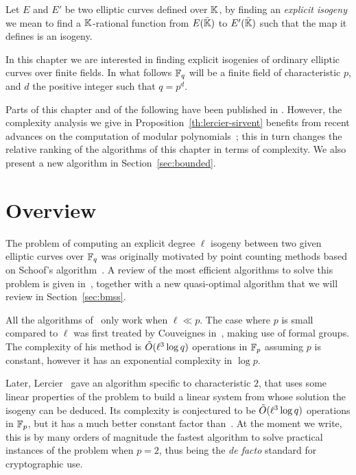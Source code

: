 

Let $E$ and $E'$ be two elliptic curves defined over $\mathbb{K}$, by finding
an \emph{explicit isogeny} we mean to find a $\mathbb{K}$-rational function
from $E(\bar{\mathbb{K}})$ to $E'(\bar{\mathbb{K}})$ such that the map it defines is
an isogeny.

In this chapter we are interested in finding explicit isogenies of
ordinary elliptic curves over finite fields. In what follows $\mathbb{F}_q$
will be a finite field of characteristic $p$, and $d$ the positive
integer such that $q=p^d$.

Parts of this chapter and of the following have been published
in \cite{df10}. However, the complexity analysis we give in
Proposition~\ref{th:lercier-sirvent} benefits from recent advances on
the computation of modular polynomials~\cite{sutherland10:modpol};
this in turn changes the relative ranking of the algorithms of this
chapter in terms of complexity. We also present a new algorithm in
Section~\ref{sec:bounded}.


\section{Overview}
\label{sec:history}

The problem of computing an explicit degree $\ell$ isogeny between two
given elliptic curves over $\mathbb{F}_q$ was originally motivated by point
counting methods based on Schoof's
algorithm~\cite{atkin88,elkies98,schoof95}. A review of the most
efficient algorithms to solve this problem is given
in~\cite{bostan+morain+salvy+schost08}, together with a new
quasi-optimal algorithm that we will review in Section~\ref{sec:bmss}.

All the algorithms of~\cite{bostan+morain+salvy+schost08} only work
when $\ell\ll p$. The case where $p$ is small compared to $\ell$ was
first treated by Couveignes in~\cite{couveignes94}, making use of
formal groups. The complexity of his method is $\tilde{O}(\ell^3\log q)$ operations in
$\mathbb{F}_p$ assuming $p$ is constant, however it has an exponential
complexity in $\log p$.

Later, Lercier~\cite{lercier96} gave an algorithm specific to
characteristic $2$, that uses some linear properties of the problem to
build a linear system from whose solution the isogeny can be deduced.
Its complexity is conjectured to be $\tilde{O}(\ell^3\log q)$ operations
in $\mathbb{F}_p$, but it has a much better constant factor
than~\cite{couveignes94}. At the moment we write, this is by many
orders of magnitude the fastest algorithm to solve practical instances
of the problem when $p=2$, thus being the \emph{de facto} standard for
cryptographic use.

